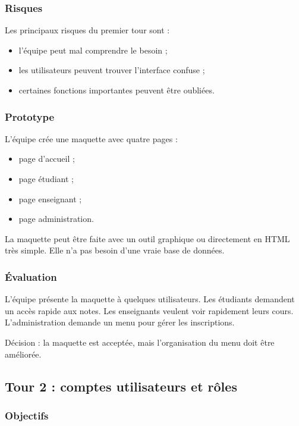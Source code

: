 \documentclass[12pt,a4paper]{article}
\begin{document}
\subsubsection{Risques}

Les principaux risques du premier tour sont :

\begin{itemize}
    \item l'équipe peut mal comprendre le besoin ;
    \item les utilisateurs peuvent trouver l'interface confuse ;
    \item certaines fonctions importantes peuvent être oubliées.
\end{itemize}

\subsubsection{Prototype}

L'équipe crée une maquette avec quatre pages :

\begin{itemize}
    \item page d'accueil ;
    \item page étudiant ;
    \item page enseignant ;
    \item page administration.
\end{itemize}

La maquette peut être faite avec un outil graphique ou directement en HTML très simple. Elle n'a pas besoin d'une vraie base de données.

\subsubsection{Évaluation}

L'équipe présente la maquette à quelques utilisateurs. Les étudiants demandent un accès rapide aux notes. Les enseignants veulent voir rapidement leurs cours. L'administration demande un menu pour gérer les inscriptions.

Décision : la maquette est acceptée, mais l'organisation du menu doit être améliorée.

\subsection{Tour 2 : comptes utilisateurs et rôles}

\subsubsection{Objectifs}
\end{document}
